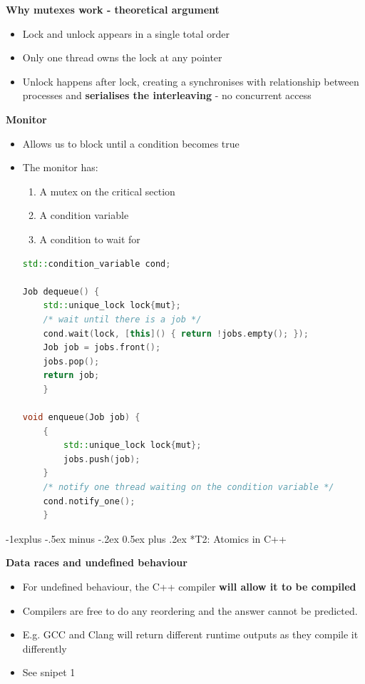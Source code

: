 \documentclass[10pt, landscape]{article}
\makeatletter
\renewcommand{\subsection}{\@startsection{subsection}{2}{0mm}%
                                {-1explus -.5ex minus -.2ex}%
                                {0.5ex plus .2ex}%
                                {\normalfont\normalsize\bfseries}}
\makeatother
\begin{document}
\begin{multicols}{4}
\textbf{Why mutexes work - theoretical argument}\\
\begin{itemize}
    \item Lock and unlock appears in a single total order
    \item Only one thread owns the lock at any pointer
    \item Unlock happens after lock, creating a synchronises with relationship between processes and \textbf{serialises the interleaving} - no concurrent access
\end{itemize}


\textbf{Monitor} \\
\begin{itemize}
    \item Allows us to block until a condition becomes true
    \item The monitor has: 
    \begin{enumerate}
        \item A mutex on the critical section
        \item A condition variable
        \item A condition to wait for 
    \end{enumerate}
    \begin{lstlisting}[language=C++, breaklines=true, breakatwhitespace=true]
std::condition_variable cond;

Job dequeue() {
    std::unique_lock lock{mut};
    /* wait until there is a job */
    cond.wait(lock, [this]() { return !jobs.empty(); });
    Job job = jobs.front();
    jobs.pop();
    return job;
    }

void enqueue(Job job) {
    {
        std::unique_lock lock{mut};
        jobs.push(job);
    }
    /* notify one thread waiting on the condition variable */
    cond.notify_one();
    }
    \end{lstlisting}
\end{itemize}


\subsection*{T2: Atomics in C++}

\textbf{Data races and undefined behaviour} \\
\begin{itemize}
    \item For undefined behaviour, the C++ compiler \textbf{will allow it to be compiled}
    \item Compilers are free to do any reordering and the answer cannot be predicted. 
    \item E.g. GCC and Clang will return different runtime outputs as they compile it differently
    \item See snipet 1
\end{itemize}


\end{multicols}
\end{document}
